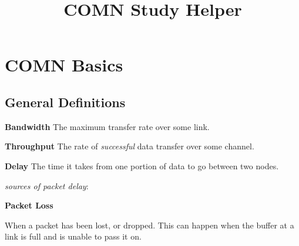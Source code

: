 \documentclass{article}
\begin{document}
\title{COMN Study Helper}
\date{}
\maketitle
\pagestyle{empty}

\tableofcontents

\section{COMN Basics}
\subsection{General Definitions}

\textbf{Bandwidth}
The maximum transfer rate over some link.

\textbf{Throughput}
The rate of \textit{successful} data transfer over some channel.

\textbf{Delay}
The time it takes from one portion of data to go between two nodes.

\textit{sources of packet delay}:


\textbf{Packet Loss}

When a packet has been lost, or dropped. This can happen when the buffer at a link is full and is unable to pass it on.
\end{document}
